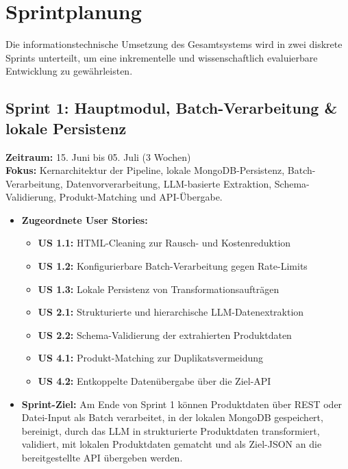 \documentclass[11pt,a4paper]{article}
\begin{document}
\newpage
\section{Sprintplanung}

Die informationstechnische Umsetzung des Gesamtsystems wird in zwei diskrete Sprints unterteilt, um eine inkrementelle und wissenschaftlich evaluierbare Entwicklung zu gewährleisten.

\subsection{Sprint 1: Hauptmodul, Batch-Verarbeitung \& lokale Persistenz}

\textbf{Zeitraum:} 15. Juni bis 05. Juli (3 Wochen) \\
\textbf{Fokus:} Kernarchitektur der Pipeline, lokale MongoDB-Persistenz, Batch-Verarbeitung, Datenvorverarbeitung, LLM-basierte Extraktion, Schema-Validierung, Produkt-Matching und API-Übergabe.

\begin{itemize}
    \item \textbf{Zugeordnete User Stories:}
    \begin{itemize}[label=$\diamond$]
        \item \textbf{US 1.1:} HTML-Cleaning zur Rausch- und Kostenreduktion
        \item \textbf{US 1.2:} Konfigurierbare Batch-Verarbeitung gegen Rate-Limits
        \item \textbf{US 1.3:} Lokale Persistenz von Transformationsaufträgen
        \item \textbf{US 2.1:} Strukturierte und hierarchische LLM-Datenextraktion
        \item \textbf{US 2.2:} Schema-Validierung der extrahierten Produktdaten
        \item \textbf{US 4.1:} Produkt-Matching zur Duplikatsvermeidung
        \item \textbf{US 4.2:} Entkoppelte Datenübergabe über die Ziel-API
    \end{itemize}
    
    \item \textbf{Sprint-Ziel:} Am Ende von Sprint 1 können Produktdaten über REST oder Datei-Input als Batch verarbeitet, in der lokalen MongoDB gespeichert, bereinigt, durch das LLM in strukturierte Produktdaten transformiert, validiert, mit lokalen Produktdaten gematcht und als Ziel-JSON an die bereitgestellte API übergeben werden.
\end{itemize}
\end{document}
